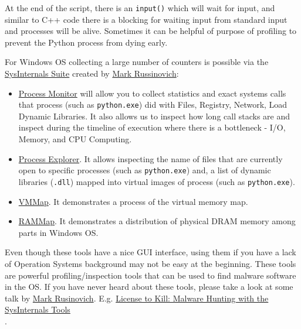 \documentclass[
]{article}
\begin{document}
At the end of the script, there is an \texttt{input()} which will wait
for input, and similar to C++ code there is a blocking for waiting input
from standard input and processes will be alive. Sometimes it can be
helpful of purpose of profiling to prevent the Python process from dying
early.

For Windows OS collecting a large number of counters is possible via the
\href{https://learn.microsoft.com/en-us/sysinternals/}{SysInternals
Suite} created by
\href{https://en.wikipedia.org/wiki/Mark_Russinovich}{Mark Russinovich}:

\begin{itemize}
\item
  \href{https://learn.microsoft.com/en-us/sysinternals/downloads/procmon}{Process
  Monitor} will allow you to collect statistics and exact systems calls
  that process (such as \texttt{python.exe}) did with Files, Registry,
  Network, Load Dynamic Libraries. It also allows us to inspect how long
  call stacks are and inspect during the timeline of execution where
  there is a bottleneck - I/O, Memory, and CPU Computing.
\item
  \href{https://learn.microsoft.com/en-us/sysinternals/downloads/process-explorer}{Process
  Explorer}. It allows inspecting the name of files that are currently
  open to specific processes (such as \texttt{python.exe}) and, a list
  of dynamic libraries (\texttt{.dll}) mapped into virtual images of
  process (such as \texttt{python.exe}).
\item
  \href{https://learn.microsoft.com/en-us/sysinternals/downloads/vmmap}{VMMap}.
  It demonstrates a process of the virtual memory map.
\item
  \href{https://learn.microsoft.com/en-us/sysinternals/downloads/RAMMap}{RAMMap}.
  It demonstrates a distribution of physical DRAM memory among parts in
  Windows OS.
\end{itemize}

Even though these tools have a nice GUI interface, using them if you
have a lack of Operation Systems background may not be easy at the
beginning. These tools are powerful profiling/inspection tools that can
be used to find malware software in the OS. If you have never heard
about these tools, please take a look at some talk by
\href{https://en.wikipedia.org/wiki/Mark_Russinovich}{Mark Rusinovich}.
E.g.
\href{https://www.youtube.com/watch?v=A_TPZxuTzBU\&ab_channel=MarkRussinovich}{License
to Kill: Malware Hunting with the SysInternals Tools\\
}.
\end{document}
